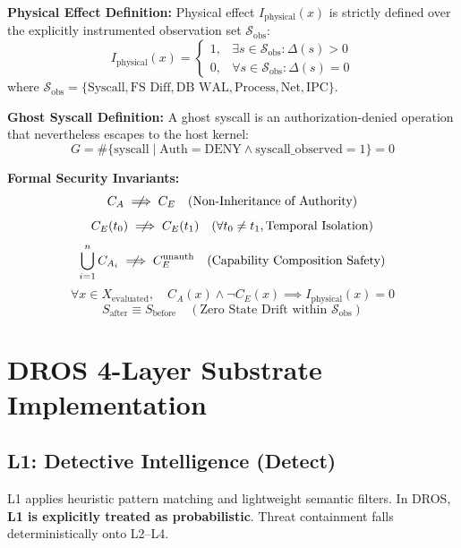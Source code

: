 \documentclass[conference]{IEEEtran}
\begin{document}
\textbf{Physical Effect Definition:} Physical effect $I_{\text{physical}}(x)$ is strictly defined over the explicitly instrumented observation set $\mathcal{S}_{\text{obs}}$:
\begin{equation}
I_{\text{physical}}(x) = \begin{cases} 1, & \exists s \in \mathcal{S}_{\text{obs}}: \Delta(s) > 0 \\ 0, & \forall s \in \mathcal{S}_{\text{obs}}: \Delta(s) = 0 \end{cases}
\end{equation}
where $\mathcal{S}_{\text{obs}} = \{ \text{Syscall}, \text{FS Diff}, \text{DB WAL}, \text{Process}, \text{Net}, \text{IPC} \}$.

\textbf{Ghost Syscall Definition:} A ghost syscall is an authorization-denied operation that nevertheless escapes to the host kernel:
\begin{equation}
G = \# \{ \text{syscall} \mid \text{Auth} = \text{DENY} \land \text{syscall\_observed} = 1 \} = 0
\end{equation}

\textbf{Formal Security Invariants:}
\begin{equation}
C_A \centernot\implies C_E \quad (\text{Non-Inheritance of Authority})
\end{equation}
\begin{equation}
C_E(t_0) \centernot\implies C_E(t_1) \quad (\forall t_0 \neq t_1, \text{Temporal Isolation})
\end{equation}
\begin{equation}
\bigcup_{i=1}^n C_{A_i} \centernot\implies C_E^{\text{unauth}} \quad (\text{Capability Composition Safety})
\end{equation}
\begin{equation}
\forall x \in X_{\text{evaluated}}, \quad C_A(x) \land \neg C_E(x) \implies I_{\text{physical}}(x) = 0
\end{equation}
\begin{equation}
S_{\text{after}} \equiv S_{\text{before}} \quad (\text{Zero State Drift within } \mathcal{S}_{\text{obs}})
\end{equation}

\section{DROS 4-Layer Substrate Implementation}
\subsection{L1: Detective Intelligence (Detect)}
L1 applies heuristic pattern matching and lightweight semantic filters. In DROS, \textbf{L1 is explicitly treated as probabilistic}. Threat containment falls deterministically onto L2--L4.
\end{document}
